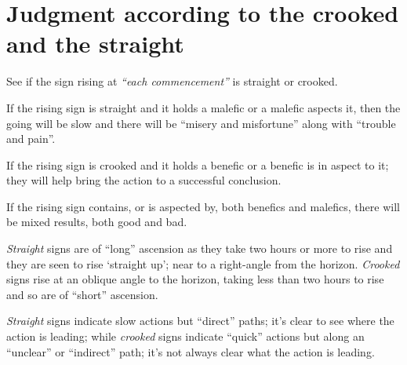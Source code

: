 \section{Judgment according to the crooked and the straight}
See if the sign rising at \textsl{``each commencement''} is straight or crooked.

If the rising sign is straight and it holds a malefic or a malefic aspects it, then the going will be slow and there will be ``misery and misfortune'' along with ``trouble and pain''.

If the rising sign is crooked and it holds a benefic or a benefic is in aspect to it; they will help bring the action to a successful conclusion.

If the rising sign contains, or is aspected by, both benefics and malefics, there will be mixed results, both good and bad.

\begin{mdframed}[backgroundcolor=cyan!5, rightmargin=1em, leftmargin=1em]
\textsl{Straight} signs are of ``long'' ascension as they take two hours or more to rise and they are seen to rise `straight up'; near to a right-angle from the horizon. \textsl{Crooked} signs rise at an oblique angle to the horizon, taking less than two hours to rise and so are of ``short'' ascension.

\textsl{Straight} signs indicate slow actions but ``direct'' paths; it's clear to see where the action is leading; while \textsl{crooked} signs indicate ``quick'' actions but along an ``unclear'' or ``indirect'' path; it's not always clear what the action is leading.
\end{mdframed}

